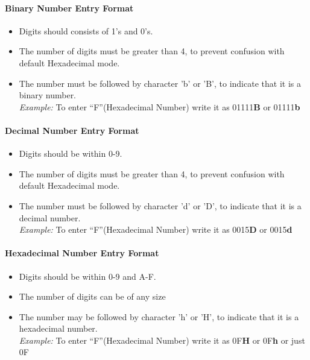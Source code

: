 \paragraph{Binary Number Entry Format}
\begin{itemize}
\item  Digits should consists of 1's and 0's.
\item The number of digits must be greater than 4, to prevent confusion with default Hexadecimal mode.
\item The number must be followed by character 'b' or 'B', to indicate that it is a binary number.\\
\textit{Example:} To enter ``F''(Hexadecimal Number) write it as  01111\textbf{B} or 01111\textbf{b}
\end{itemize}
 
\paragraph{Decimal Number Entry Format}
\begin{itemize}
\item  Digits should be within 0-9.
\item The number of digits must be greater than 4, to prevent confusion with default Hexadecimal mode.
\item The number must be followed by character 'd' or 'D', to indicate that it is a decimal number.\\
\textit{Example:} To enter ``F''(Hexadecimal Number) write it as  0015\textbf{D} or 0015\textbf{d}
\end{itemize}

\paragraph{Hexadecimal Number Entry Format}
 \begin{itemize}
 \item  Digits should be within 0-9 and A-F.
 \item The number of digits can be of any size
 \item The number may be followed by character 'h' or 'H', to indicate that it is a hexadecimal number.\\
 \textit{Example:} To enter ``F''(Hexadecimal Number) write it as  0F\textbf{H} or 0F\textbf{h} or just 0F
 \end{itemize}